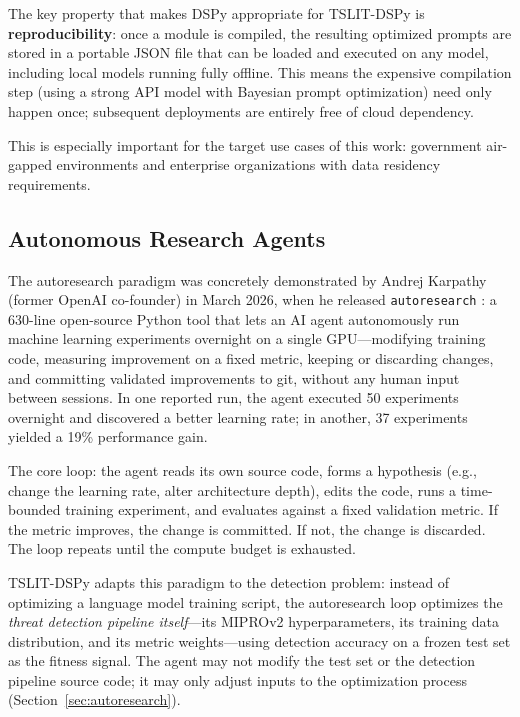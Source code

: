\documentclass[11pt]{article}
\begin{document}
The key property that makes DSPy appropriate for TSLIT-DSPy is
\textbf{reproducibility}: once a module is compiled, the resulting
optimized prompts are stored in a portable JSON file that can be loaded
and executed on any model, including local models running fully offline.
This means the expensive compilation step (using a strong API model
with Bayesian prompt optimization) need only happen once; subsequent
deployments are entirely free of cloud dependency.

This is especially important for the target use cases of this work:
government air-gapped environments and enterprise organizations with
data residency requirements.

\subsection{Autonomous Research Agents}

The autoresearch paradigm was concretely demonstrated by Andrej Karpathy
(former OpenAI co-founder) in March 2026, when he released
\texttt{autoresearch} \cite{karpathy_autoresearch}: a 630-line open-source
Python tool that lets an AI agent autonomously run machine learning
experiments overnight on a single GPU---modifying training code, measuring
improvement on a fixed metric, keeping or discarding changes, and
committing validated improvements to git, without any human input between
sessions. In one reported run, the agent executed 50 experiments overnight
and discovered a better learning rate; in another, 37 experiments yielded a
19\% performance gain.

The core loop: the agent reads its own source code, forms a hypothesis
(e.g., change the learning rate, alter architecture depth), edits the code,
runs a time-bounded training experiment, and evaluates against a fixed
validation metric. If the metric improves, the change is committed. If not,
the change is discarded. The loop repeats until the compute budget is
exhausted.

TSLIT-DSPy adapts this paradigm to the detection problem: instead of
optimizing a language model training script, the autoresearch loop optimizes
the \emph{threat detection pipeline itself}---its MIPROv2 hyperparameters,
its training data distribution, and its metric weights---using detection
accuracy on a frozen test set as the fitness signal. The agent may
not modify the test set or the detection pipeline source code; it may only
adjust inputs to the optimization process (Section~\ref{sec:autoresearch}).
\end{document}
